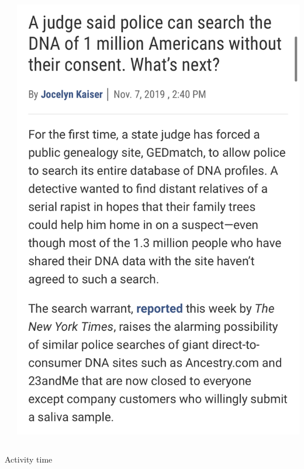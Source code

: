 \documentclass[main]{subfiles}
\begin{document}
\begin{frame}
\begin{columns}
\begin{column}{0.33\textwidth}
\end{column}
\begin{column}{0.33\textwidth}
\centering
\includegraphics[width=\textwidth]{figures/news/23andme.PNG}
\end{column}
\end{columns}
\end{frame}




\begin{frame}[standout]

Activity time
  
\end{frame}
\end{document}
